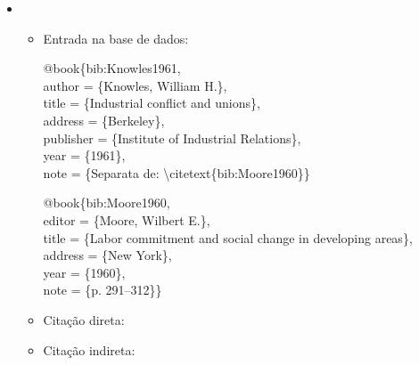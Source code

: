 \documentclass[a4paper,12pt,oneside,onecolumn]{uerj}
\newcommand{\formato}[1]{\begin{flushleft}{#1}\end{flushleft}}
\begin{document}
\begin{itemize}[label={Ex.:},leftmargin=\parindent,parsep=0pt,itemsep=0pt]
  \item \formato{\citetext{bib:Knowles1961}}


  \begin{itemize}[leftmargin=*,parsep=0pt,itemsep=0pt]
    \item Entrada na base de dados:

    \formato{
      @book\{bib:Knowles1961,\\
        author = \{Knowles, William H.\},\\
        title = \{Industrial conflict and unions\},\\
        address = \{Berkeley\},\\
        publisher = \{Institute of Industrial Relations\},\\
        year = \{1961\},\\
        note = \{Separata de: \textbackslash citetext\{bib:Moore1960\}\}\\
    }

    \formato{
      @book\{bib:Moore1960,\\
        editor = \{Moore, Wilbert E.\},\\
        title = \{Labor commitment and social change in developing areas\},\\
        address = \{New York\},\\
        year = \{1960\},\\
        note = \{{p}. 291--312\}\}\\
    }

    \item Citação direta: 
    \item Citação indireta: \cite{bib:Knowles1961}\\
  \end{itemize}
\end{itemize}
\end{document}
